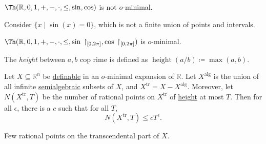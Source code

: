 \begin{remark}
	\(\Th(\mathbb{R} , 0, 1, +, -, \cdot, \leq , \sin , \cos ) \) is not \(o\)-minimal.
\end{remark}
\begin{explanation}
	Consider \(\{ x \mid \sin (x) = 0 \} \), which is not a finite union of points and intervals.
\end{explanation}

\begin{remark}
	\(\Th(\mathbb{R} , 0, 1, +, -, \cdot, \leq , \sin{} \upharpoonright _{[0, 2\pi ]}, \cos{} \upharpoonright _{[0, 2\pi ]}) \) is \(o\)-minimal.
\end{remark}

\begin{definition}[Height]\label{def:height}
	The \emph{height} between \(a, b\) cop rime is defined as \(\operatorname{height}(a / b) \coloneqq \max (a, b)\).
\end{definition}

\begin{theorem}
	Let \(X \subseteq \mathbb{R} ^n\) be \hyperref[def:definable]{definable} in an \(o\)-minimal expansion of \(\mathbb{R} \). Let \(X^{\mathrm{alg} }\) is the union of all infinite \hyperref[def:semialgebraic]{semialgebraic} subsets of \(X\), and \(X^{\mathrm{tr} } = X - X^{\mathrm{alg} }\). Moreover, let \(N(X^{\mathrm{tr} }, T)\) be the number of rational points on \(X^{\mathrm{tr} }\) of \hyperref[def:height]{height} at most \(T\). Then for all \(\epsilon \), there is a \(c\) such that for all \(T\),
	\[
		N(X^{\mathrm{tr} }, T) \leq c T^{\epsilon } .
	\]
\end{theorem}

\begin{intuition}
	Few rational points on the transcendental part of \(X\).
\end{intuition}


